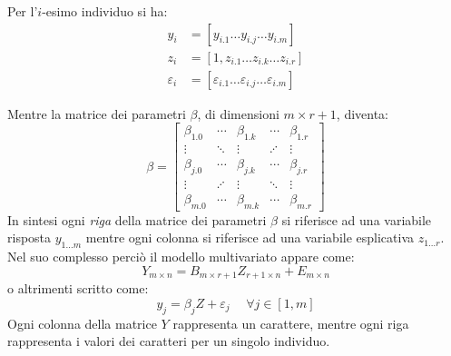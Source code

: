 \documentclass[a4page, 11pt]{article} %
\begin{document}
Per l'$i$-esimo individuo si ha:
\begin{align*}
y_i &= [y_{i.1} \ldots y_{i.j} \ldots y_{i.m}]\\
z_i &= [1, z_{i.1} \ldots z_{i.k} \ldots z_{i.r}]\\
\varepsilon_i &= [\varepsilon_{i.1} \ldots \varepsilon_{i.j} \ldots \varepsilon_{i.m}]
\end{align*}

Mentre la matrice dei parametri $\beta$, di dimensioni $m \times r+1$, diventa:
\begin{equation*}
\beta =
\begin{bmatrix}
   \beta_{1.0} & \cdots & \beta_{1.k} & \cdots & \beta_{1.r} \\
   \vdots      & \ddots & \vdots      & \iddots & \vdots \\
   \beta_{j.0} & \cdots & \beta_{j.k} & \cdots & \beta_{j.r} \\
   \vdots      & \iddots& \vdots      & \ddots & \vdots \\
   \beta_{m.0} & \cdots & \beta_{m.k} & \cdots & \beta_{m.r} 
\end{bmatrix}
\end{equation*}
In sintesi ogni \textit{riga} della matrice dei parametri $\beta$ si riferisce ad una variabile risposta $y_{1 \dots m}$ mentre ogni colonna si riferisce ad una variabile esplicativa $z_{1 \dots r}$. 
\newline
Nel suo complesso perciò il modello multivariato appare come:
\begin{equation*}
  Y_{m \times n} = B_{m \times r + 1} Z_{r+1 \times n} + E_{m \times n}
\end{equation*}
o altrimenti scritto come:
\begin{equation*}
  y_j = \beta_j Z + \varepsilon_j \hspace{15pt} \forall j \in [1, m]
\end{equation*}
Ogni colonna della matrice $Y$ rappresenta un carattere, mentre ogni riga rappresenta i valori dei caratteri per un singolo individuo.
\end{document}
